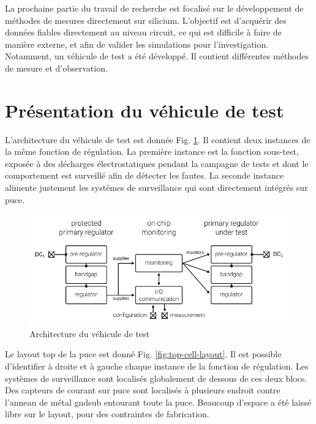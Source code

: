 La prochaine partie du travail de recherche est focalisé sur le développement de méthodes de mesures directement sur silicium.
L'objectif est d'acquérir des données fiables directement au niveau circuit, ce qui est difficile à faire de manière externe, et afin de valider les simulations pour l'investigation.
Notamment, un véhicule de test a été développé.
Il contient différentes méthodes de mesure et d'observation.

\section{Présentation du véhicule de test}

L'architecture du véhicule de test est donnée Fig. \ref{architecture_testchip}.
Il contient deux instances de la même fonction de régulation.
La première instance est la fonction sous-test, exposée à des décharges électrostatiques pendant la campagne de tests et dont le comportement est surveillé afin de détecter les fautes.
La seconde instance alimente justement les systèmes de surveillance qui sont directement intégrés sur puce.

\begin{figure}[h]
  \centering
  \includegraphics{src/1/figures/architecture_testchip.pdf}
  \caption{Architecture du véhicule de test}
  \label{architecture_testchip}
\end{figure}

Le layout top de la puce est donné Fig. \ref{fig:top-cell-layout}.
Il est possible d'identifier à droite et à gauche chaque instance de la fonction de régulation.
Les systèmes de surveillance sont localisés globalement de dessous de ces deux blocs.
Des capteurs de courant sur puce sont localisés à plusieurs endroit contre l'anneau de métal gndsub entourant toute la puce.
Beaucoup d'espace a été laissé libre sur le layout, pour des contraintes de fabrication.

